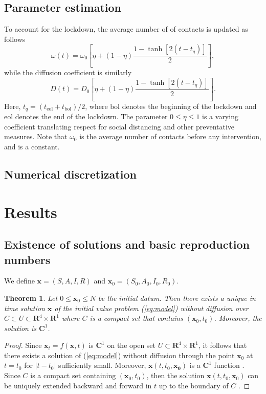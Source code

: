 \documentclass[11pt]{article}
\newcommand{\R}{\mathbf{R}}
\newcommand{\C}{\mathbf{C}}
\renewcommand\vec{\mathbf}
\newtheorem{theorem}{Theorem}
\begin{document}
	\subsection{Parameter estimation}
		To account for the lockdown, the average number of of contacts is updated as follows \cite{Kevrekidis-2021}
		\begin{equation} \label{eq:contacts}
			\omega (t) = \omega_0 \left[ \eta + (1 - \eta) \frac{1 - \tanh \left[2 (t - t_q) \right]}{2} \right],
		\end{equation}
		while the diffusion coefficient is similarly
		\begin{equation} \label{eq:diffusion}
			D (t) = D_0 \left[ \eta + (1 - \eta) \frac{1 - \tanh \left[2 (t - t_q) \right]}{2} \right].
		\end{equation}
		Here, $t_q = (t_{\mathrm{eol}} + t_{\mathrm{bol}}) / 2$, where $\mathrm{bol}$ denotes the beginning of the lockdown and $\mathrm{eol}$ denotes the end of the lockdown.
		The parameter $0 \leq \eta \leq 1$ is a varying coefficient translating respect for social distancing and other preventative measures.
		Note that $\omega_0$ is the average number of contacts before any intervention, and is a constant.
	
	\subsection{Numerical discretization}
	
\section{Results}
	\subsection{Existence of solutions and basic reproduction numbers}
		We define $\vec{x} = (S,  A, I, R)$ and $\vec{x}_0 = (S_0, A_0, I_0, R_0)$.
		\begin{theorem}
			Let $0 \leq \vec{x}_0 \leq N$ be the initial datum.
			Then there exists a unique in time solution $\vec{x}$ of the initial value problem (\ref{eq:model}) without diffusion over $C \subset U \subset \R^4 \times \R^1$ where $C$ is a compact set that contains $(\vec{x}_0, t_0)$.
			Moreover, the solution is $\C^1$.
		\end{theorem}
		\begin{proof}
			Since $\vec{x}_t = f(\vec{x},t)$ is $\C^1$ on the open set $U \subset \R^4 \times \R^1$, it follows that there exists a solution of (\ref{eq:model}) without diffusion through the point $\vec{x}_0$ at $t = t_0$ for $|t - t_0|$ sufficiently small.
			Moreover, $\vec{x} (t, t_0,\vec{x_0})$ is a $\C^1$ function \cite{dynamics}.
			Since $C$ is a compact set containing $(\vec{x}_0, t_0)$, then the solution $\vec{x} (t, t_0, \vec{x}_0)$ can be uniquely extended backward and forward in $t$ up to the boundary of $C$ \cite{dynamics}.
		\end{proof}
		
\end{document}
